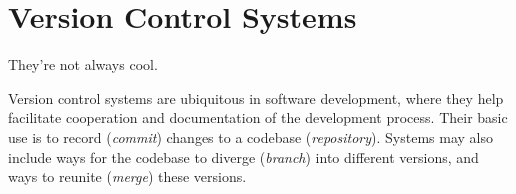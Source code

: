 \chapter{Version Control Systems}
They're not always cool.~\cite{git-inconsistent}

Version control systems are ubiquitous in software development, where they
help facilitate cooperation and documentation of
the development process. Their basic use is to record (\emph{commit}) changes
to a codebase (\emph{repository}). Systems may also include ways for the
codebase to diverge (\emph{branch}) into different versions, and ways to
reunite (\emph{merge}) these versions.